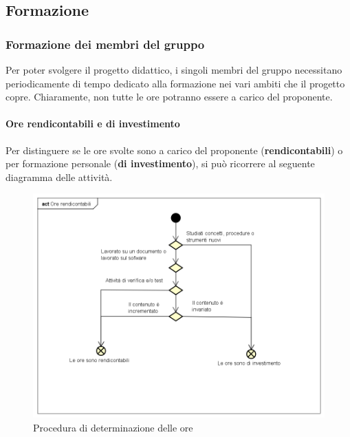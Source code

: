 \documentclass[../NormeProgetto.tex]{subfiles}
\begin{document}
	\subsection{Formazione}
		\subsubsection{Formazione dei membri del gruppo}
			Per poter svolgere il progetto didattico, i singoli membri del gruppo necessitano periodicamente di tempo dedicato alla formazione nei vari ambiti che il progetto copre. Chiaramente, non tutte le ore potranno essere a carico del proponente.
			\paragraph{Ore rendicontabili e di investimento}
				Per distinguere se le ore svolte sono a carico del proponente (\textbf{rendicontabili}) o per formazione personale (\textbf{di investimento}), si può ricorrere al seguente diagramma delle attività.
			\begin{figure}[H]
					\centering
					\includegraphics[scale=0.5, width=\textwidth]{sections/img/oreRendicontabili.png}
					\caption{Procedura di determinazione delle ore}\label{fig:Procedura di determinazione delle ore} 
				\end{figure}
				
\end{document}
